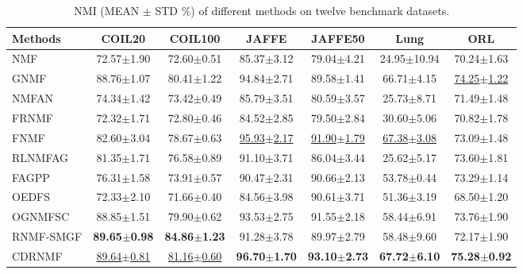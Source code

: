 \documentclass[a4paper,fleqn]{cas-sc}
\begin{document}
\begin{table}[htbp]
	\centering
	\caption{NMI (MEAN $\pm$ STD $\%$) of different methods on twelve benchmark datasets.}
	{\footnotesize
	\begin{tabular}{lcccccc}
		\hline
		\textbf{Methods} & \textbf{COIL20} & \textbf{COIL100} & \textbf{JAFFE} & \textbf{JAFFE50} & \textbf{Lung} & \textbf{ORL} \\
		\hline
		NMF & 72.57$\pm$1.90 & 72.60$\pm$0.51 & 85.37$\pm$3.12 & 79.04$\pm$4.21 & 24.95$\pm$10.94 & 70.24$\pm$1.63 \\
		GNMF & 88.76$\pm$1.07 & 80.41$\pm$1.22 & 94.84$\pm$2.71 & 89.58$\pm$1.41 & 66.71$\pm$4.15 & \underline{74.25$\pm$1.22} \\
		NMFAN & 74.34$\pm$1.42 & 73.42$\pm$0.49 & 85.79$\pm$3.51 & 80.59$\pm$3.57 & 25.73$\pm$8.71 & 71.49$\pm$1.48 \\
		FRNMF & 72.32$\pm$1.71 & 72.80$\pm$0.46 & 84.52$\pm$2.85 & 79.50$\pm$2.84 & 30.60$\pm$5.06 & 70.82$\pm$1.78 \\
		FNMF & 82.60$\pm$3.04 & 78.67$\pm$0.63 & \underline{95.93$\pm$2.17} & \underline{91.90$\pm$1.79} & \underline{67.38$\pm$3.08} & 73.09$\pm$1.48 \\
		RLNMFAG & 81.35$\pm$1.71 & 76.58$\pm$0.89 & 91.10$\pm$3.71 & 86.04$\pm$3.44 & 25.62$\pm$5.17 & 73.60$\pm$1.81 \\
		FAGPP & 76.31$\pm$1.58 & 73.91$\pm$0.57 & 90.47$\pm$2.31 & 90.66$\pm$2.13 & 53.78$\pm$0.44 & 73.29$\pm$1.14 \\
		OEDFS & 72.33$\pm$2.10 & 71.66$\pm$0.40 & 84.56$\pm$3.98 & 90.61$\pm$3.71 & 51.36$\pm$3.19 & 68.50$\pm$1.20 \\
		OGNMFSC & 88.85$\pm$1.51 & 79.90$\pm$0.62 & 93.53$\pm$2.75 & 91.55$\pm$2.18 & 58.44$\pm$6.91 & 73.76$\pm$1.90 \\
		RNMF-SMGF & \textbf{89.65$\pm$0.98} & \textbf{84.86$\pm$1.23} & 91.28$\pm$3.78 & 89.97$\pm$2.79 & 58.48$\pm$9.60 & 72.17$\pm$1.90 \\
		CDRNMF & \underline{89.64$\pm$0.81} & \underline{81.16$\pm$0.60} & \textbf{96.70$\pm$1.70} & \textbf{93.10$\pm$2.73} & \textbf{67.72$\pm$6.10} & \textbf{75.28$\pm$0.92} \\
		\hline
		

\end{tabular}}
\end{table}
\end{document}
